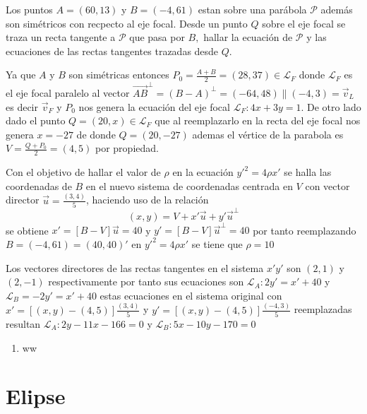 \documentclass[12pt,]{report}
\providecommand{\tightlist}{%
  \setlength{\itemsep}{0pt}\setlength{\parskip}{0pt}}
\theoremstyle{slplain}
\let\BeginKnitrBlock\begin \let\EndKnitrBlock\end
\begin{document}
\BeginKnitrBlock{exercise}
\protect\hypertarget{exr:unnamed-chunk-7}{}{\label{exr:unnamed-chunk-7} }Los puntos \(A=(60,13)\) y \(B=(-4,61)\) estan sobre una parábola \(\mathcal{P}\) además son simétricos con recpecto al eje focal. Desde un punto \(Q\) sobre el eje focal se traza un recta tangente a \(\mathcal{P}\) que pasa por \(B,\) hallar la ecuación de \(\mathcal{P}\) y las ecuaciones de las rectas tangentes trazadas desde \(Q\).
\EndKnitrBlock{exercise}

\BeginKnitrBlock{solution}
{}Ya que \(A\) y \(B\) son simétricas entonces \(P_0=\frac{A+B}{2}=(28,37) \in \mathcal{L}_F\) donde \(\mathcal{L}_F\) es el eje focal paralelo al vector \(\vec{AB}^\perp=(B-A)^\perp=(-64,48)\parallel(-4,3)=\vec{v}_L\) es decir \(\vec{v}_F\) y \(P_0\) nos genera la ecuación del eje focal \(\mathcal{L}_F:4x+3y=1\). De otro lado dado el punto \(Q=(20,x)\in\mathcal{L}_F\) que al reemplazarlo en la recta del eje focal nos genera \(x=-27\) de donde \(Q=(20,-27)\) ademas el vértice de la parabola es \(V=\frac{Q+P_0}{2}=(4,5)\) por propiedad.

Con el objetivo de hallar el valor de \(\rho\) en la ecuación \(y'^2=4\rho x'\) se halla las coordenadas de \(B\) en el nuevo sistema de coordenadas centrada en \(V\) con vector director \(\vec{u}=\frac{(3,4)}{5}\), haciendo uso de la relación \[(x,y)=V+x'\vec{u}+y'\vec{u}^\perp\] se obtiene \(x'=\left[B-V\right]\vec{u}=40\) y \(y'=\left[B-V\right]\vec{u}^\perp=40\) por tanto reemplazando \(B=(-4,61)=(40,40)'\) en \(y'^2=4\rho x'\) se tiene que \(\rho=10\)

Los vectores directores de las rectas tangentes en el sistema \(x'y'\) son \((2,1)\) y \((2,-1)\) respectivamente por tanto sus ecuaciones son \(\mathcal{L}_A: 2y'=x'+40\) y \(\mathcal{L}_B=-2y'=x'+40\) estas ecuaciones en el sistema original con \(x'=\left[(x,y)-(4,5)\right]\frac{(3,4)}{5}\) y \(y'=\left[(x,y)-(4,5)\right]\frac{(-4,3)}{5}\) reemplazadas resultan \(\mathcal{L}_A:2y-11x-166=0\) y \(\mathcal{L}_B:5x-10y-170=0\)
\EndKnitrBlock{solution}

\begin{enumerate}
\def\labelenumi{\arabic{enumi}.}
\tightlist
\item
  ww
\end{enumerate}

\hypertarget{elipse}{%
\chapter{Elipse}\label{elipse}}
\end{document}

